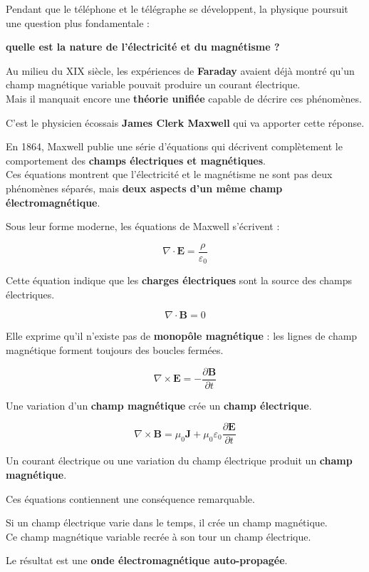 \documentclass[
  french,
]{article}
\begin{document}
Pendant que le téléphone et le télégraphe se développent, la physique
poursuit une question plus fondamentale :

\textbf{quelle est la nature de l'électricité et du magnétisme ?}

Au milieu du XIX siècle, les expériences de \textbf{Faraday} avaient
déjà montré qu'un champ magnétique variable pouvait produire un courant
électrique.\\
Mais il manquait encore une \textbf{théorie unifiée} capable de décrire
ces phénomènes.

C'est le physicien écossais \textbf{James Clerk Maxwell} qui va apporter
cette réponse.

En 1864, Maxwell publie une série d'équations qui décrivent complètement
le comportement des \textbf{champs électriques et magnétiques}.\\
Ces équations montrent que l'électricité et le magnétisme ne sont pas
deux phénomènes séparés, mais \textbf{deux aspects d'un même champ
électromagnétique}.

Sous leur forme moderne, les équations de Maxwell s'écrivent :

\[
\nabla \cdot \mathbf{E} = \frac{\rho}{\varepsilon_0}
\]

Cette équation indique que les \textbf{charges électriques} sont la
source des champs électriques.

\[
\nabla \cdot \mathbf{B} = 0
\]

Elle exprime qu'il n'existe pas de \textbf{monopôle magnétique} : les
lignes de champ magnétique forment toujours des boucles fermées.

\[
\nabla \times \mathbf{E} = -\frac{\partial \mathbf{B}}{\partial t}
\]

Une variation d'un \textbf{champ magnétique} crée un \textbf{champ
électrique}.

\[
\nabla \times \mathbf{B} =
\mu_0 \mathbf{J} + \mu_0 \varepsilon_0
\frac{\partial \mathbf{E}}{\partial t}
\]

Un courant électrique ou une variation du champ électrique produit un
\textbf{champ magnétique}.

Ces équations contiennent une conséquence remarquable.

Si un champ électrique varie dans le temps, il crée un champ
magnétique.\\
Ce champ magnétique variable recrée à son tour un champ électrique.

Le résultat est une \textbf{onde électromagnétique auto-propagée}.
\end{document}
